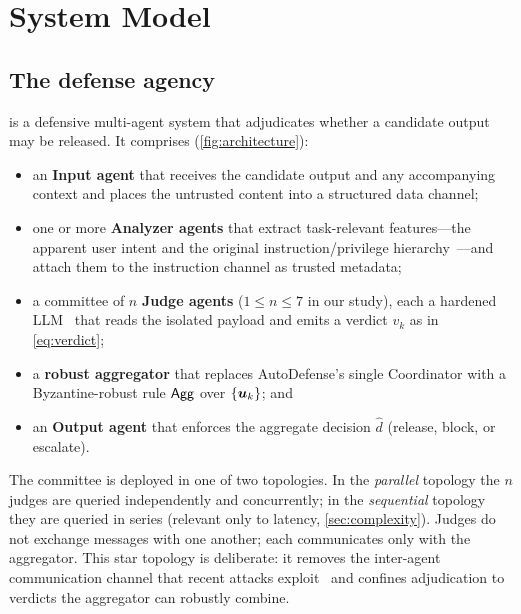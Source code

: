 \section{System Model}
\label{sec:system}



\subsection{The defense agency}
\Aegis is a defensive multi-agent system that adjudicates whether a candidate output may
be released. It comprises (\cref{fig:architecture}):
\begin{itemize}[leftmargin=1.4em,itemsep=2pt,topsep=2pt]
  \item an \textbf{Input agent} that receives the candidate output and any accompanying
        context and places the untrusted content into a structured data channel;
  \item one or more \textbf{Analyzer agents} that extract task-relevant features—the
        apparent user intent and the original instruction/privilege
        hierarchy~\cite{wallace2024instruction}—and attach them to the instruction
        channel as trusted metadata;
  \item a committee of $n$ \textbf{Judge agents} ($1\le n\le 7$ in our study), each a
        hardened LLM~\cite{chen2025secalign,chen2024struq} that reads the isolated
        payload and emits a verdict $v_k$ as in \cref{eq:verdict};
  \item a \textbf{robust aggregator} that replaces AutoDefense's single Coordinator with
        a Byzantine-robust rule $\mathsf{Agg}$ over $\{\bm{u}_k\}$; and
  \item an \textbf{Output agent} that enforces the aggregate decision $\hat d$ (release,
        block, or escalate).
\end{itemize}
The committee is deployed in one of two topologies. In the \emph{parallel} topology the
$n$ judges are queried independently and concurrently; in the \emph{sequential} topology
they are queried in series (relevant only to latency, \cref{sec:complexity}). Judges do
not exchange messages with one another; each communicates only with the aggregator. This
star topology is deliberate: it removes the inter-agent communication channel that
recent attacks exploit~\cite{he2025redteaming,lee2024promptinfection} and confines
adjudication to verdicts the aggregator can robustly combine.

